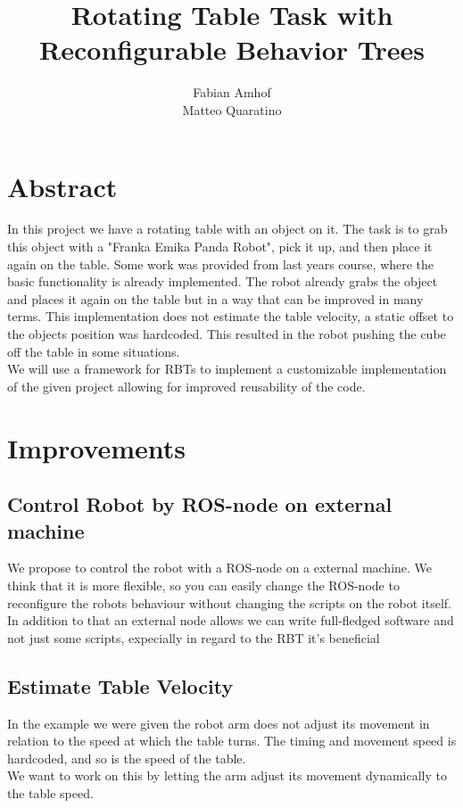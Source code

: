 \documentclass[report]{iisthesis}
\title{Rotating Table Task with Reconfigurable Behavior Trees}
\author{Fabian Amhof \\ Matteo Quaratino}
\begin{document}
\maketitle
{}
\chapter{Abstract}
In this project we have a rotating table with an object on it. The task is to grab this object with a "Franka Emika Panda Robot", pick it up, and then place it again on the table. 
Some work was provided from last years course, where the basic functionality is already implemented. 
The robot already grabs the object and places it again on the table but in a way that can be improved in many terms.
This implementation does not estimate the table velocity, a static offset to the objects position was hardcoded. This resulted in the robot pushing the cube off the table in some situations.\\
We will use a framework for RBTs to implement a customizable implementation of the given project allowing for improved reusability of the code. 

\tableofcontents
\label{chap:declare}

\chapter{Improvements}
\label{improvements}

\section{Control Robot by ROS-node on external machine}
\label{separate_node}
We propose to control the robot with a ROS-node on a external machine. 
We think that it is more flexible, so you can easily change the ROS-node to reconfigure the robots behaviour without changing the scripts on the robot itself. In addition to that an external node allows we can write full-fledged software and not just
some scripts, expecially in regard to the RBT it's beneficial

\section{Estimate Table Velocity}
\label{estimate_velocity}
In the example we were given the robot arm does not adjust its movement in relation to the speed at which the table 
turns. The timing and movement speed is hardcoded, and so is the speed of the table. \\
We want to work on this by letting the arm adjust its movement dynamically to the table speed.
\end{document}
